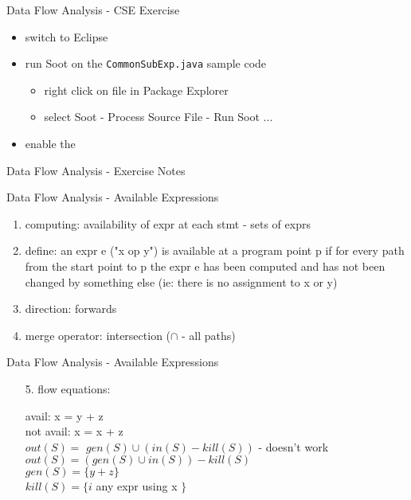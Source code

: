 \documentclass[mcgill,slideColor,colorBG,pdf]{prosper}
\begin{document}
\begin{slide} {Data Flow Analysis - CSE Exercise}
\begin{itemize}
\item switch to Eclipse
\item run Soot on the \texttt{CommonSubExp.java} sample code
\begin{itemize}
\item right click on file in Package Explorer
\item select Soot - Process Source File - Run Soot ...
\end{itemize}
\item enable the 
\end{itemize}
\end{slide}

\begin{slide} {Data Flow Analysis - Exercise Notes}
\end{slide}

\begin{slide} {Data Flow Analysis - Available Expressions}
\begin{enumerate}
\item computing: availability of expr at each stmt - sets of exprs
\item define: an expr e ("x op y") is available at a program point p if for every path from the start point to p the expr e has been computed and has not been changed by something else (ie: there is no assignment to x or y)
\item direction: forwards
\item merge operator: intersection ($\cap$ - all paths)
\end{enumerate}
\end{slide}

\begin{slide} {Data Flow Analysis - Available Expressions}
\begin{itemize}
\item[5.] flow equations:\\ 
\begin{center}\end{center}
\begin{small}
avail: x = y + z\\
not avail: x = x + z\\
$out(S) =$ \sout{$gen(S) \cup (in(S) - kill(S))$} - doesn't work\\
$out(S) = (gen(S) \cup in(S)) - kill(S)$\\
$gen(S) = \{ y + z \}$\\
$kill(S) = \{i$ any expr using x $\}$
\end{small}
\end{itemize}
\end{slide}
\end{document}
